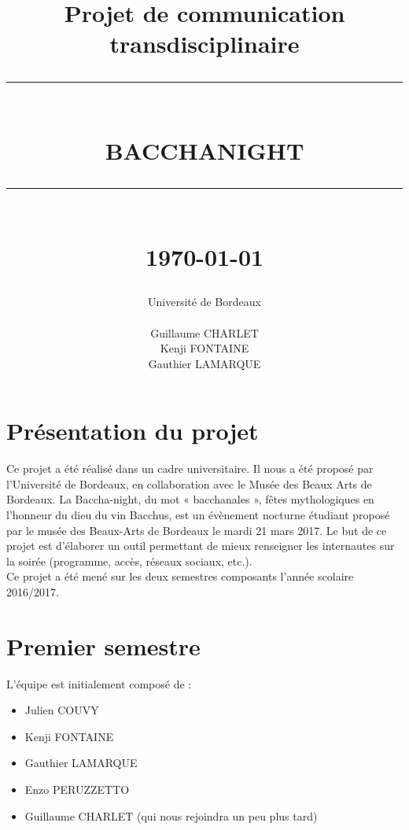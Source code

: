 \documentclass[11pt]{report}
\newcommand{\HRule}[1]{\rule{\linewidth}{#1}}
\renewcommand{\thesection}{\arabic{section}}
\begin{document}
\title
{
	\Large{Projet de communication transdisciplinaire}
	\HRule{2pt} \\ [0.5cm]
	\LARGE \textbf{\uppercase{Bacchanight}}
	\HRule{2pt} \\ [0.5cm]
	\normalsize \today
}

\date{}

\author
{
	\LARGE{Université de Bordeaux} \\
	\\
	Guillaume CHARLET \\
    Kenji FONTAINE \\
    Gauthier LAMARQUE \\
}

\maketitle


\renewcommand{\thesection}{\arabic{section}}

\section{Présentation du projet}

Ce projet a été réalisé dans un cadre universitaire. Il nous a été proposé par
l'Université de Bordeaux, en collaboration avec le Musée des Beaux Arts de Bordeaux.
La Baccha-night, du mot « bacchanales », fêtes mythologiques en l’honneur du
dieu du vin Bacchus, est un évènement nocturne étudiant proposé par le musée
des Beaux-Arts de Bordeaux le mardi 21 mars 2017.
Le but de ce projet est d'élaborer un outil permettant de mieux renseigner
les internautes sur la soirée (programme, accès, réseaux sociaux, etc.). \\
Ce projet a été mené sur les deux semestres composants l'année scolaire 2016/2017.

\section{Premier semestre}

L'équipe est initialement composé de :
\begin{itemize}
 	\item Julien COUVY
    \item Kenji FONTAINE
    \item Gauthier LAMARQUE
    \item Enzo PERUZZETTO
	\item Guillaume CHARLET (qui nous rejoindra un peu plus tard)
\end{itemize}
\end{document}
